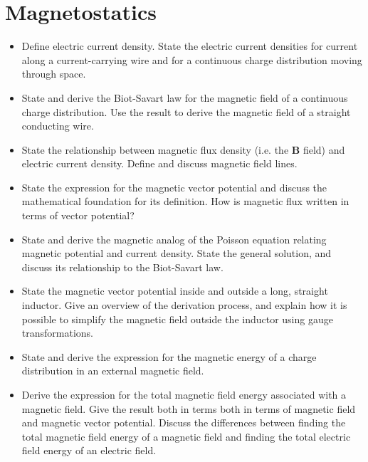 \section{Magnetostatics}

\begin{itemize}

    \item Define electric current density. State the electric current densities for current along a current-carrying wire and for a continuous charge distribution moving through space.

    \item State and derive the Biot-Savart law for the magnetic field of a continuous charge distribution. Use the result to derive the magnetic field of a straight conducting wire.

    \item State the relationship between magnetic flux density (i.e. the $ \bm{B} $ field) and electric current density. Define and discuss magnetic field lines.

    \item State the expression for the magnetic vector potential and discuss the mathematical foundation for its definition. How is magnetic flux written in terms of vector potential?

    \item State and derive the magnetic analog of the Poisson equation relating magnetic potential and current density. State the general solution, and discuss its relationship to the Biot-Savart law.

    \item State the magnetic vector potential inside and outside a long, straight inductor. Give an overview of the derivation process, and explain how it is possible to simplify the magnetic field outside the inductor using gauge transformations.

    \item State and derive the expression for the magnetic energy of a charge distribution in an external magnetic field.

    \item Derive the expression for the total magnetic field energy associated with a magnetic field. Give the result both in terms both in terms of magnetic field and magnetic vector potential. Discuss the differences between finding the total magnetic field energy of a magnetic field and finding the total electric field energy of an electric field.


\end{itemize}
